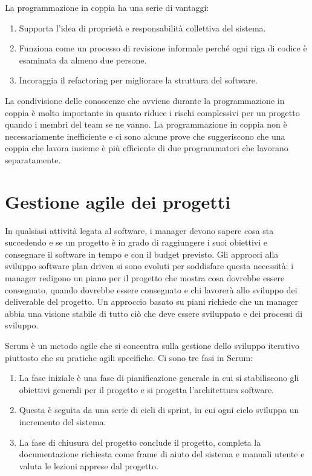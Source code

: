 La programmazione in coppia ha una serie di vantaggi:
\begin{enumerate}
    \item Supporta l'idea di proprietà e responsabilità collettiva del sistema.
    \item Funziona come un processo di revisione informale perché ogni riga di codice è esaminata da almeno due persone.
    \item Incoraggia il refactoring per migliorare la struttura del software.
\end{enumerate}
La condivisione delle conoscenze che avviene durante la programmazione in coppia è molto importante in quanto riduce i rischi complessivi per un progetto quando i membri del team se ne vanno. La programmazione in coppia non è necessariamente inefficiente e ci sono alcune prove che suggeriscono che una coppia che lavora insieme è più efficiente di due programmatori che lavorano separatamente.

\section{Gestione agile dei progetti}
In qualsiasi attività legata al software, i manager devono sapere cosa sta succedendo e se un progetto è in grado di raggiungere i suoi obiettivi e consegnare il software in tempo e con il budget previsto. Gli approcci alla sviluppo software plan driven si sono evoluti per soddisfare questa necessità: i manager redigono un piano per il progetto che mostra cosa dovrebbe essere consegnato, quando dovrebbe essere consegnato e chi lavorerà allo sviluppo dei deliverable del progetto. Un approccio basato su piani richiede che un manager abbia una visione stabile di tutto ciò che deve essere sviluppato e dei processi di sviluppo.

Scrum è un metodo agile che si concentra sulla gestione dello sviluppo iterativo piuttosto che su pratiche agili specifiche. Ci sono tre fasi in Scrum:
\begin{enumerate}
    \item La fase iniziale è una fase di pianificazione generale in cui si stabiliscono gli obiettivi generali per il progetto e si progetta l'architettura software.
    \item Questa è seguita da una serie di cicli di sprint, in cui ogni ciclo sviluppa un incremento del sistema.
    \item La fase di chiusura del progetto conclude il progetto, completa la documentazione richiesta come frame di aiuto del sistema e manuali utente e valuta le lezioni apprese dal progetto.
\end{enumerate}

